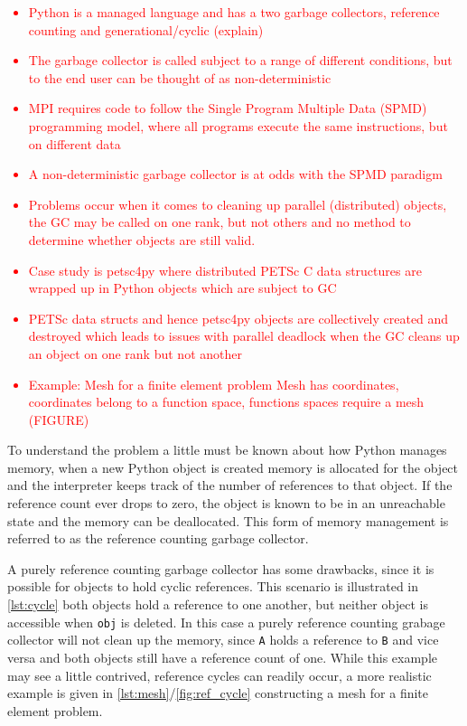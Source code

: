 \documentclass[10pt,journal,compsoc]{IEEEtran}
\newcommand{\jacknotes}[1]{\textcolor{red}{#1}}
\begin{document}
\jacknotes{
\begin{itemize}
	\item Python is a managed language and has a two garbage collectors, reference counting and generational/cyclic (explain)
	\item The garbage collector is called subject to a range of different conditions, but to the end user can be thought of as non-deterministic
	\item MPI requires code to follow the Single Program Multiple Data (SPMD) programming model, where all programs execute the same instructions, but on different data
	\item A non-deterministic garbage collector is at odds with the SPMD paradigm
	\item Problems occur when it comes to cleaning up parallel (distributed) objects, the GC may be called on one rank, but not others and no method to determine whether objects are still valid.
	\item Case study is petsc4py where distributed PETSc C data structures are wrapped up in Python objects which are subject to GC
	\item PETSc data structs and hence petsc4py objects are collectively created and destroyed which leads to issues with parallel deadlock when the GC cleans up an object on one rank but not another
	\item Example: Mesh for a finite element problem Mesh has coordinates, coordinates belong to a function space, functions spaces require a mesh (FIGURE) 
\end{itemize}
}

To understand the problem a little must be known about how Python manages memory, when a new Python object is created memory is allocated for the object and the interpreter keeps track of the number of references to that object.
If the reference count ever drops to zero, the object is known to be in an unreachable state and the memory can be deallocated.
This form of memory management is referred to as the reference counting garbage collector.

A purely reference counting garbage collector has some drawbacks, since it is possible for objects to hold cyclic references.
This scenario is illustrated in \cref{lst:cycle} both objects hold a reference to one another, but neither object is accessible when \verb`obj` is deleted.
In this case a purely reference counting grabage collector will not clean up the memory, since \verb`A` holds a reference to \verb`B` and vice versa and both objects still have a reference count of one.
While this example may see a little contrived, reference cycles can readily occur, a more realistic example is given in \cref{lst:mesh}/\cref{fig:ref_cycle} constructing a mesh for a finite element problem.
\end{document}
